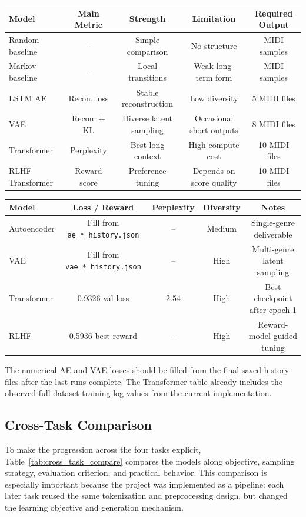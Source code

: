 \documentclass{article}
\begin{document}
\begin{center}
\begin{tabular}{lcccc}
\toprule
Model & Main Metric & Strength & Limitation & Required Output \\
\midrule
Random baseline & -- & Simple comparison & No structure & MIDI samples \\
Markov baseline & -- & Local transitions & Weak long-term form & MIDI samples \\
LSTM AE & Recon. loss & Stable reconstruction & Low diversity & 5 MIDI files \\
VAE & Recon. + KL & Diverse latent sampling & Occasional short outputs & 8 MIDI files \\
Transformer & Perplexity & Best long context & High compute cost & 10 MIDI files \\
RLHF Transformer & Reward score & Preference tuning & Depends on score quality & 10 MIDI files \\
\bottomrule
\end{tabular}
\end{center}

\begin{center}
\begin{tabular}{lcccc}
\toprule
Model & Loss / Reward & Perplexity & Diversity & Notes \\
\midrule
Autoencoder & Fill from \texttt{ae\_*\_history.json} & -- & Medium & Single-genre deliverable \\
VAE & Fill from \texttt{vae\_*\_history.json} & -- & High & Multi-genre latent sampling \\
Transformer & 0.9326 val loss & 2.54 & High & Best checkpoint after epoch 1 \\
RLHF & 0.5936 best reward & -- & High & Reward-model-guided tuning \\
\bottomrule
\end{tabular}
\end{center}

The numerical AE and VAE losses should be filled from the final saved history files after the last runs complete. The Transformer table already includes the observed full-dataset training log values from the current implementation.


\subsection{Cross-Task Comparison}
To make the progression across the four tasks explicit, Table~\ref{tab:cross_task_compare} compares the models along objective, sampling strategy, evaluation criterion, and practical behavior. This comparison is especially important because the project was implemented as a pipeline: each later task reused the same tokenization and preprocessing design, but changed the learning objective and generation mechanism.
\end{document}

